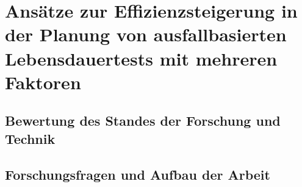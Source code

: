 
\chapter{Ansätze zur Effizienzsteigerung in der Planung von ausfallbasierten Lebensdauertests mit mehreren Faktoren}

\section{Bewertung des Standes der Forschung und Technik}

\section{Forschungsfragen und Aufbau der Arbeit}